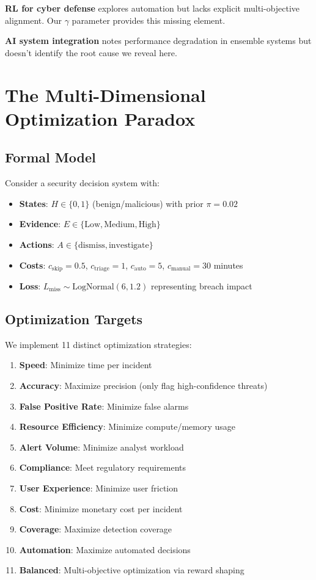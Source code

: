 \documentclass[11pt]{article}
\begin{document}
\textbf{RL for cyber defense} \cite{austin2024rlsoc} explores automation but lacks explicit multi-objective alignment. Our $\gamma$ parameter provides this missing element.

\textbf{AI system integration} \cite{smith2024integration} notes performance degradation in ensemble systems but doesn't identify the root cause we reveal here.

\section{The Multi-Dimensional Optimization Paradox}

\subsection{Formal Model}
Consider a security decision system with:
\begin{itemize}
\item \textbf{States}: $H \in \{0, 1\}$ (benign/malicious) with prior $\pi = 0.02$
\item \textbf{Evidence}: $E \in \{\text{Low}, \text{Medium}, \text{High}\}$
\item \textbf{Actions}: $A \in \{\text{dismiss}, \text{investigate}\}$
\item \textbf{Costs}: $c_{\text{skip}} = 0.5$, $c_{\text{triage}} = 1$, $c_{\text{auto}} = 5$, $c_{\text{manual}} = 30$ minutes
\item \textbf{Loss}: $L_{\text{miss}} \sim \text{LogNormal}(6, 1.2)$ representing breach impact
\end{itemize}

\subsection{Optimization Targets}
We implement 11 distinct optimization strategies:

\begin{enumerate}
\item \textbf{Speed}: Minimize time per incident
\item \textbf{Accuracy}: Maximize precision (only flag high-confidence threats)
\item \textbf{False Positive Rate}: Minimize false alarms
\item \textbf{Resource Efficiency}: Minimize compute/memory usage
\item \textbf{Alert Volume}: Minimize analyst workload
\item \textbf{Compliance}: Meet regulatory requirements
\item \textbf{User Experience}: Minimize user friction
\item \textbf{Cost}: Minimize monetary cost per incident
\item \textbf{Coverage}: Maximize detection coverage
\item \textbf{Automation}: Maximize automated decisions
\item \textbf{Balanced}: Multi-objective optimization via reward shaping
\end{enumerate}
\end{document}
